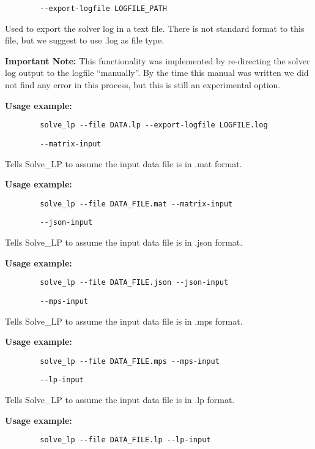 \documentclass[12pt,hidelinks]{article}
\begin{document}
	{\color{mordantred19}
	\begin{verbatim}
		--export-logfile LOGFILE_PATH
	\end{verbatim}
	} Used to export the solver log in a text file. There is not standard format to this file, but we suggest to use .log as file type.

	\textbf{Important Note:} This functionality was implemented by re-directing the solver log output to the logfile ``manually''. By the time this manual was written we did not find any error in this process, but this is still an experimental option.
	
	\textbf{Usage example:} 
	\begin{verbatim}
		solve_lp --file DATA.lp --export-logfile LOGFILE.log
	\end{verbatim}

	{\color{mordantred19}
	\begin{verbatim}
		--matrix-input
	\end{verbatim}
	} Tells Solve\_LP to assume the input data file is in .mat format.

	\textbf{Usage example:} 
	\begin{verbatim}
		solve_lp --file DATA_FILE.mat --matrix-input
	\end{verbatim}

	{\color{mordantred19}
	\begin{verbatim}
		--json-input
	\end{verbatim}
	} Tells Solve\_LP to assume the input data file is in .json format.

	\textbf{Usage example:} 
	\begin{verbatim}
		solve_lp --file DATA_FILE.json --json-input
	\end{verbatim}

	{\color{mordantred19}
	\begin{verbatim}
		--mps-input
	\end{verbatim}
	} Tells Solve\_LP to assume the input data file is in .mps format.

	\textbf{Usage example:} 
	\begin{verbatim}
		solve_lp --file DATA_FILE.mps --mps-input
	\end{verbatim}

	{\color{mordantred19}
	\begin{verbatim}
		--lp-input
	\end{verbatim}
	} Tells Solve\_LP to assume the input data file is in .lp format.

	\textbf{Usage example:} 
	\begin{verbatim}
		solve_lp --file DATA_FILE.lp --lp-input
	\end{verbatim}
\end{document}
